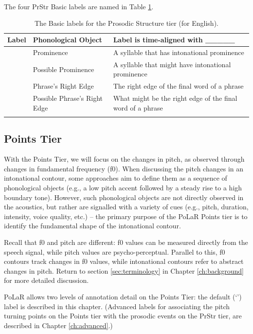 \documentclass[11pt, twoside]{memoir}
\def\textlabel#1{{\relsize{-.5}\fontspec[Mapping=tex-text]{Roboto Mono}{#1}}}
\begin{document}
The four PrStr Basic labels are named in Table \ref{PrStr basic labels}.

\begin{longtable}{clp{.525\linewidth}} \toprule \textbf{Label} & \textbf{Phonological Object} & \textbf{Label is time-aligned with \_\_\_\_\_}\tabularnewline
\midrule \endhead
\textlabel{*} & Prominence & A syllable that has intonational prominence \tabularnewline
\textlabel{?*} & Possible Prominence & A syllable that might have intonational prominence \tabularnewline
\textlabel{]} & Phrase’s Right Edge & The right edge of the final word of a phrase \tabularnewline
\textlabel{?]} & Possible Phrase’s Right Edge & What might be the right edge of the final word of a phrase \tabularnewline
\bottomrule 
\caption{The Basic labels for the Prosodic Structure tier (for English).%
\label{PrStr basic labels}%
}
\end{longtable}

\subsection{Points Tier}\label{sec:points}

With the Points Tier, we will focus on the changes in pitch, as observed through changes in fundamental frequency (f0). When discussing the pitch changes in an intonational contour, some approaches aim to define them as a sequence of phonological objects (e.g., a low pitch accent followed by a steady rise to a high boundary tone). However, such phonological objects are not directly observed in the acoustics, but rather are signalled with a variety of cues (e.g., pitch, duration, intensity, voice quality, etc.) – the primary purpose of the PoLaR Points tier is to identify the fundamental shape of the intonational contour.

\begin{infobox}[frametitle=\textbf{A NOTE ON TERMINOLOGY}]
Recall that f0 and pitch are different: f0 values can be measured directly from the speech signal, while pitch values are psycho-perceptual. Parallel to this, f0 contours track changes in f0 values, while intonational contours refer to abstract changes in pitch. Return to section \ref{sec:terminology} in Chapter \ref{ch:background} for more detailed discussion.\label{terminology f0 pitch}
\end{infobox}

PoLaR allows two levels of annotation detail on the Points Tier: the default (‘\textlabel{0}’) label is described in this chapter. (Advanced labels for associating the pitch turning points on the Points tier with the prosodic events on the PrStr tier, are described in Chapter \ref{ch:advanced}.)
\end{document}
